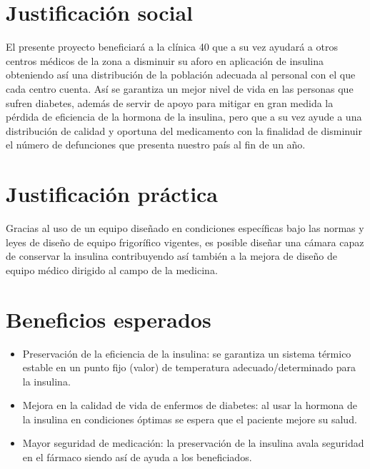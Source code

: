 \section*{Justificación social}

El presente proyecto beneficiará a la clínica 40 que a su vez ayudará a otros centros médicos de la zona a disminuir su aforo en aplicación de insulina obteniendo así una distribución de la población adecuada al personal con el que cada centro cuenta. Así se garantiza un mejor nivel de vida en las personas que sufren diabetes, además de servir de apoyo para mitigar en gran medida la pérdida de eficiencia de la hormona de la insulina, pero que a su vez ayude a una distribución de calidad y oportuna del medicamento con la finalidad de disminuir el número de defunciones que presenta nuestro país al fin de un año.

 
\section*{Justificación práctica}
Gracias al uso de un equipo diseñado en condiciones específicas bajo las normas y leyes de diseño de equipo frigorífico vigentes, es posible diseñar una cámara capaz de conservar la insulina contribuyendo así también a la mejora de diseño de equipo médico dirigido al campo de la medicina.  

\newpage
\section*{Beneficios esperados}
\begin{itemize}
	\item	Preservación de la eficiencia de la insulina: se garantiza un sistema térmico estable en un punto fijo (valor) de temperatura adecuado/determinado para la insulina. 
	\item 	Mejora en la calidad de vida de enfermos de diabetes: al usar la hormona de la insulina en condiciones óptimas se espera que el paciente mejore su salud.
	\item Mayor seguridad de medicación: la preservación de la insulina avala seguridad en el fármaco siendo así de ayuda a los beneficiados.
	
\end{itemize}



 
